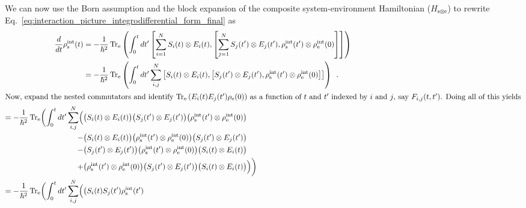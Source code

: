 \documentclass{article}
\begin{document}
We can now use the Born assumption and the block expansion of the composite
system-environment Hamiltonian ($ H_{\textrm{s} \otimes \textrm{e}} $) to
rewrite Eq.~\ref{eq:interaction_picture_integrodifferential_form_final} as
\begin{align}
   \frac{d}{dt} \rho^{\textrm{int}}_{\textrm{s}}(t)
   &= - \frac{1}{\hbar^{2}}
    \Tr_{\textrm{e}} \left( \int_{0}^{t} dt' \left[ \sum^{N}_{i=1} S_{i}(t)
          \otimes E_{i}(t) , \left[ \sum^{N}_{j=1} S_{j}(t') \otimes E_{j}(t'),
    \rho^{\textrm{int}}_{\textrm{s}}(t') \otimes \rho^{\textrm{int}}_{\textrm{e}}(0) \right] \right] \right) \\
   &= - \frac{1}{\hbar^{2}}
    \Tr_{\textrm{e}} \left( \int_{0}^{t} dt' \sum^{N}_{i,j} \left[ S_{i}(t)
          \otimes E_{i}(t) , \left[ S_{j}(t') \otimes E_{j}(t'),
   \rho^{\textrm{int}}_{\textrm{s}}(t') \otimes
   \rho^{\textrm{int}}_{\textrm{e}}(0) \right] \right] \right) \enskip. \\
   \intertext{Now, expand the nested commutators and identify $
   \Tr_{\textrm{e}}\left(E_{i}(t) E_{j}(t') \rho_{\textrm{e}}(0)\right) $ as a
   function of $ t $ and $ t' $ indexed by $ i $ and $ j $, say $ F_{i,j}(t,t')
   $. Doing all of this yields}
   = - \frac{1}{\hbar^{2}} \Tr_{\textrm{e}} \biggl(  \int_{0}^{t} dt' \sum^{N}_{i,j}
       \Bigl(
          &\bigl( S_{i}(t) \otimes E_{i}(t) \bigr)
          \bigl( S_{j}(t') \otimes E_{j}(t') \bigr)
          \bigl( \rho^{\textrm{int}}_{\textrm{s}}(t') \otimes
          \rho^{\textrm{int}}_{\textrm{e}}(0) \bigr) \\
          -& \bigl( S_{i}(t) \otimes E_{i}(t) \bigr)
          \bigl( \rho^{\textrm{int}}_{\textrm{s}}(t') \otimes
          \rho^{\textrm{int}}_{\textrm{e}}(0) \bigr)
          \bigl( S_{j}(t') \otimes E_{j}(t') \bigr) \nonumber \\
          -& \bigl(  S_{j}(t') \otimes E_{j}(t')\bigr)
          \bigl(  \rho^{\textrm{int}}_{\textrm{s}}(t') \otimes
   \rho^{\textrm{int}}_{\textrm{e}}(0)\bigr)
          \bigl(  S_{i}(t) \otimes E_{i}(t)\bigr) \nonumber \\
          +& \bigl(  \rho^{\textrm{int}}_{\textrm{s}}(t') \otimes
   \rho^{\textrm{int}}_{\textrm{e}}(0)\bigr)
          \bigl(  S_{j}(t') \otimes E_{j}(t')\bigr)
          \bigl(  S_{i}(t) \otimes E_{i}(t)\bigr)
       \Bigr) \biggr)  \nonumber \\
       = -\frac{1}{\hbar^{2}} \Tr_{\textrm{e}} \biggl(  \int_{0}^{t} dt' \sum^{N}_{i,j}
          \Bigl(
             &\bigl( S_{i}(t) S_{j}(t') \rho^{\textrm{int}}_{\textrm{s}}(t')

\end{align}
\end{document}
